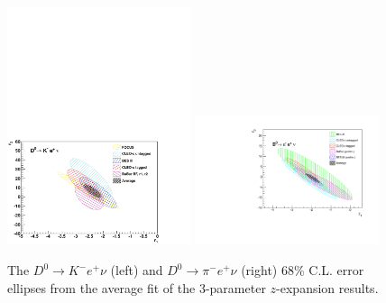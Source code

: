 \begin{figure}[p]
\begin{center}
\includegraphics[bb=  0 0 520 356, width=0.48\textwidth]{figures/charm/Kenu_r1r2_ellipses.pdf}\hfill
\includegraphics[width=0.48\textwidth]{figures/charm/sl_new_r1r2_pi.pdf}
\caption{The $D^0\to K^-e^+\nu$ (left) and $D^0\to \pi^-e^+\nu$ (right) 68\% C.L. error ellipses from the
average fit of the 3-parameter $z$-expansion results. 
\label{fig:fitellipse}}
\end{center}
\end{figure}




